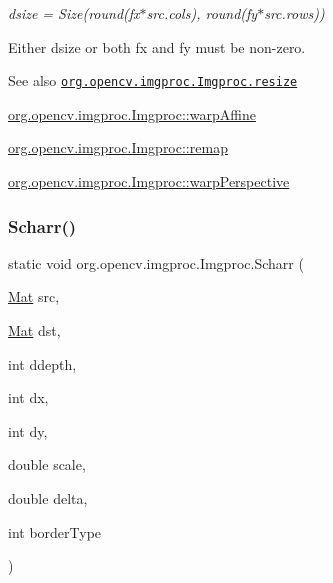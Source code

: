 {\itshape dsize = Size(round(fx$\ast$src.cols), round(fy$\ast$src.rows))}

Either {\ttfamily dsize} or both {\ttfamily fx} and {\ttfamily fy} must be non-\/zero.

\begin{DoxySeeAlso}{See also}
\href{http://docs.opencv.org/modules/imgproc/doc/geometric_transformations.html#resize}{\tt org.\+opencv.\+imgproc.\+Imgproc.\+resize} 

\mbox{\hyperlink{classorg_1_1opencv_1_1imgproc_1_1_imgproc_a139ccfb9b241fc867096f4c850088058}{org.\+opencv.\+imgproc.\+Imgproc\+::warp\+Affine}} 

\mbox{\hyperlink{classorg_1_1opencv_1_1imgproc_1_1_imgproc_a8a8e3511105ae0f5fbd525e31ad7672c}{org.\+opencv.\+imgproc.\+Imgproc\+::remap}} 

\mbox{\hyperlink{classorg_1_1opencv_1_1imgproc_1_1_imgproc_aad167fa9fe0009a54f7732488102938c}{org.\+opencv.\+imgproc.\+Imgproc\+::warp\+Perspective}} 
\end{DoxySeeAlso}
\mbox{\label{classorg_1_1opencv_1_1imgproc_1_1_imgproc_a94c9e2fdd65ecd76ae9135e33cfb9a99}} 
\subsubsection{\texorpdfstring{Scharr()}{Scharr()}\hspace{0.1cm}{\footnotesize\ttfamily [1/3]}}
{\footnotesize\ttfamily static void org.\+opencv.\+imgproc.\+Imgproc.\+Scharr (\begin{DoxyParamCaption}\item[{\mbox{\hyperlink{classorg_1_1opencv_1_1core_1_1_mat}{Mat}}}]{src,  }\item[{\mbox{\hyperlink{classorg_1_1opencv_1_1core_1_1_mat}{Mat}}}]{dst,  }\item[{int}]{ddepth,  }\item[{int}]{dx,  }\item[{int}]{dy,  }\item[{double}]{scale,  }\item[{double}]{delta,  }\item[{int}]{border\+Type }\end{DoxyParamCaption})\hspace{0.3cm}{\ttfamily [static]}}

